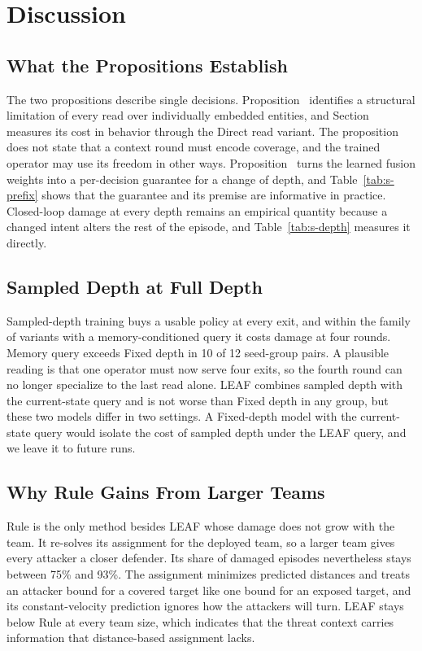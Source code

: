 \section{Discussion}
\label{sec:s-discussion}

\subsection{What the Propositions Establish}
The two propositions describe single decisions. Proposition~ identifies a structural limitation of every read over individually embedded entities, and Section~ measures its cost in behavior through the Direct read variant. The proposition does not state that a context round must encode coverage, and the trained operator may use its freedom in other ways. Proposition~ turns the learned fusion weights into a per-decision guarantee for a change of depth, and Table~\ref{tab:s-prefix} shows that the guarantee and its premise are informative in practice. Closed-loop damage at every depth remains an empirical quantity because a changed intent alters the rest of the episode, and Table~\ref{tab:s-depth} measures it directly.

\subsection{Sampled Depth at Full Depth}
Sampled-depth training buys a usable policy at every exit, and within the family of variants with a memory-conditioned query it costs damage at four rounds. Memory query exceeds Fixed depth in 10 of 12 seed-group pairs. A plausible reading is that one operator must now serve four exits, so the fourth round can no longer specialize to the last read alone. LEAF combines sampled depth with the current-state query and is not worse than Fixed depth in any group, but these two models differ in two settings. A Fixed-depth model with the current-state query would isolate the cost of sampled depth under the LEAF query, and we leave it to future runs.

\subsection{Why Rule Gains From Larger Teams}
Rule is the only method besides LEAF whose damage does not grow with the team. It re-solves its assignment for the deployed team, so a larger team gives every attacker a closer defender. Its share of damaged episodes nevertheless stays between 75\% and 93\%. The assignment minimizes predicted distances and treats an attacker bound for a covered target like one bound for an exposed target, and its constant-velocity prediction ignores how the attackers will turn. LEAF stays below Rule at every team size, which indicates that the threat context carries information that distance-based assignment lacks.

